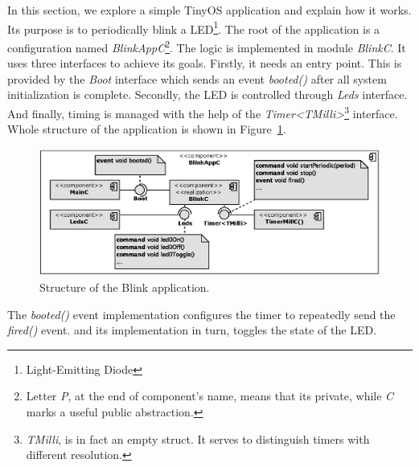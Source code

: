In this section, we explore a simple TinyOS application and explain
how it works. Its purpose is to periodically blink a
LED\footnote{Light-Emitting Diode}. The root of the application is a
configuration named \emph{BlinkAppC}\footnote{Letter \emph{P}, at the end
of component's name, means that its private, while \emph{C} marks a
useful public abstraction.}. The logic is implemented in module \emph{BlinkC}.
It uses three interfaces to achieve its goals. Firstly, it needs an
entry point. This is provided by the \emph{Boot} interface which sends an
event \emph{booted()} after all system initialization is complete.
Secondly, the LED is controlled through \emph{Leds} interface.
And finally, timing is managed with the help of the
\emph{Timer<TMilli>}\footnote{\emph{TMilli}, is in fact an empty
struct. It serves to distinguish timers with different resolution.}
interface. Whole structure of the application is shown in
Figure~\ref{fig:app_anatomy}.
\begin{figure}[h]
  \centering
  \includegraphics[width=1.01\textwidth]{diagrams/app_anatomy.eps}
  \caption{Structure of the Blink application.}
  \label{fig:app_anatomy}
\end{figure}
The \emph{booted()} event implementation configures the timer to
repeatedly send the \emph{fired()} event.  and its implementation in
turn, toggles the state of the LED.

